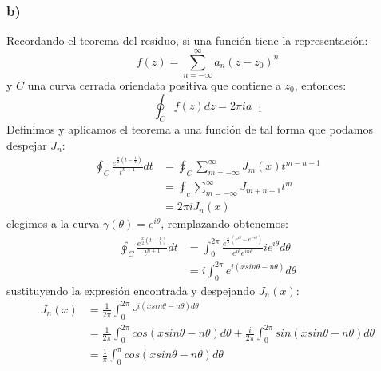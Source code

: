 \documentclass{article}
\begin{document}
\begin{tcolorbox}[breakable]
    \subsubsection*{b)}
    Recordando el teorema del residuo, si una función tiene la representación:
    \[ f(z) = \sum_{n=-\infty}^\infty a_n(z-z_0)^n \]
    y $C$ una curva cerrada oriendata positiva que contiene a $z_0$, entonces:
    \[ \oint_C f(z)dz = 2\pi ia_{-1} \]
    Definimos y aplicamos el teorema a una función de tal forma que podamos despejar $J_n$:
    \begin{align*}
        \oint_C \frac{e^{\frac{x}{2}(t-\frac{1}{t})}}{t^{n+1}} dt 
        &= \oint_C \sum_{m=-\infty}^\infty J_m(x)t^{m-n-1} \\
        &= \oint_c \sum_{m=-\infty}^\infty J_{m+n+1}t^m \\
        &= 2\pi i J_n(x)
    \end{align*}
    elegimos a la curva $\gamma(\theta) = e^{i\theta}$, remplazando obtenemos:
    \begin{align*}
        \oint_C \frac{e^{\frac{x}{2}(t-\frac{1}{t})}}{t^{n+1}} dt 
        &= \int_0^{2\pi} \frac{e^{\frac{x}{2}(e^{i\theta}-e^{-i\theta})}}{e^{i\theta}e^{in\theta}} ie^{i\theta} d\theta \\
        &= i\int_{0}^{2\pi} e^{i(xsin\theta - n\theta)}d\theta 
    \end{align*}
    sustituyendo la expresión encontrada y despejando $J_n(x)$:
    \begin{align*}
        J_n(x)
        &= \frac{1}{2\pi} \int_0^{2\pi} e^{i(xsin\theta - n\theta)d\theta} \\
        &= \frac{1}{2\pi} \int_0^{2\pi} cos(xsin\theta - n\theta)d\theta + \frac{i}{2\pi}\int_0^{2\pi}sin(xsin\theta-n\theta)d\theta \\
        &= \frac{1}{\pi} \int_0^\pi cos(xsin\theta - n\theta)d\theta
    \end{align*}
\end{tcolorbox}
\end{document}
